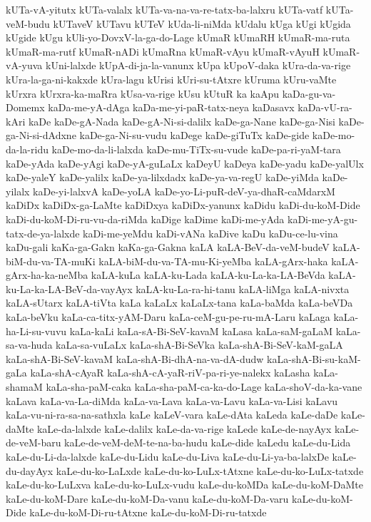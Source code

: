 {kUTa-vA-yitutx
kUTa-valalx
kUTa-va-na-va-re-tatx-ba-lalxru
kUTa-vatf
kUTa-veM-budu
kUTaveV
kUTavu
kUTeV
kUda-li-niMda
kUdalu
kUga
kUgi
kUgida
kUgide
kUgu
kUli-yo-DovxV-la-ga-do-Lage
kUmaR
kUmaRH
kUmaR-ma-ruta
kUmaR-ma-rutf
kUmaR-nADi
kUmaRna
kUmaR-vAyu
kUmaR-vAyuH
kUmaR-vA-yuva
kUni-lalxde
kUpA-di-ja-la-vanunx
kUpa
kUpoV-daka
kUra-da-va-rige
kUra-la-ga-ni-kakxde
kUra-lagu
kUrisi
kUri-su-tAtxre
kUruma
kUru-vaMte
kUrxra
kUrxra-ka-maRra
kUsa-va-rige
kUsu
kUtuR
ka
kaApu
kaDa-gu-va-Domemx
kaDa-me-yA-dAga
kaDa-me-yi-paR-tatx-neya
kaDasavx
kaDa-vU-ra-kAri
kaDe
kaDe-gA-Nada
kaDe-gA-Ni-si-dalilx
kaDe-ga-Nane
kaDe-ga-Nisi
kaDe-ga-Ni-si-dAdxne
kaDe-ga-Ni-su-vudu
kaDege
kaDe-giTuTx
kaDe-gide
kaDe-mo-da-la-ridu
kaDe-mo-da-li-lalxda
kaDe-mu-TiTx-su-vude
kaDe-pa-ri-yaM-tara
kaDe-yAda
kaDe-yAgi
kaDe-yA-guLaLx
kaDeyU
kaDeya
kaDe-yadu
kaDe-yalUlx
kaDe-yaleY
kaDe-yalilx
kaDe-ya-lilxdadx
kaDe-ya-va-regU
kaDe-yiMda
kaDe-yilalx
kaDe-yi-lalxvA
kaDe-yoLA
kaDe-yo-Li-puR-deV-ya-dhaR-caMdarxM
kaDiDx
kaDiDx-ga-LaMte
kaDiDxya
kaDiDx-yanunx
kaDidu
kaDi-du-koM-Dide
kaDi-du-koM-Di-ru-vu-da-riMda
kaDige
kaDime
kaDi-me-yAda
kaDi-me-yA-gu-tatx-de-ya-lalxde
kaDi-me-yeMdu
kaDi-vANa
kaDive
kaDu
kaDu-ce-lu-vina
kaDu-gali
kaKa-ga-Gakn
kaKa-ga-Gakna
kaLA
kaLA-BeV-da-veM-budeV
kaLA-biM-du-va-TA-muKi
kaLA-biM-du-va-TA-mu-Ki-yeMba
kaLA-gArx-haka
kaLA-gArx-ha-ka-neMba
kaLA-kuLa
kaLA-ku-Lada
kaLA-ku-La-ka-LA-BeVda
kaLA-ku-La-ka-LA-BeV-da-vayAyx
kaLA-ku-La-ra-hi-tanu
kaLA-liMga
kaLA-nivxta
kaLA-sUtarx
kaLA-tiVta
kaLa
kaLaLx
kaLaLx-tana
kaLa-baMda
kaLa-beVDa
kaLa-beVku
kaLa-ca-titx-yAM-Daru
kaLa-ceM-gu-pe-ru-mA-Laru
kaLaga
kaLa-ha-Li-su-vuvu
kaLa-kaLi
kaLa-sA-Bi-SeV-kavaM
kaLasa
kaLa-saM-gaLaM
kaLa-sa-va-huda
kaLa-sa-vuLaLx
kaLa-shA-Bi-SeVka
kaLa-shA-Bi-SeV-kaM-gaLA
kaLa-shA-Bi-SeV-kavaM
kaLa-shA-Bi-dhA-na-va-dA-dudw
kaLa-shA-Bi-su-kaM-gaLa
kaLa-shA-cAyaR
kaLa-shA-cA-yaR-riV-pa-ri-ye-nalekx
kaLasha
kaLa-shamaM
kaLa-sha-paM-caka
kaLa-sha-paM-ca-ka-do-Lage
kaLa-shoV-da-ka-vane
kaLava
kaLa-va-La-diMda
kaLa-va-Lava
kaLa-va-Lavu
kaLa-va-Lisi
kaLavu
kaLa-vu-ni-ra-sa-na-sathxla
kaLe
kaLeV-vara
kaLe-dAta
kaLeda
kaLe-daDe
kaLe-daMte
kaLe-da-lalxde
kaLe-dalilx
kaLe-da-va-rige
kaLede
kaLe-de-nayAyx
kaLe-de-veM-baru
kaLe-de-veM-deM-te-na-ba-hudu
kaLe-dide
kaLedu
kaLe-du-Lida
kaLe-du-Li-da-lalxde
kaLe-du-Lidu
kaLe-du-Liva
kaLe-du-Li-ya-ba-lalxDe
kaLe-du-dayAyx
kaLe-du-ko-LaLxde
kaLe-du-ko-LuLx-tAtxne
kaLe-du-ko-LuLx-tatxde
kaLe-du-ko-LuLxva
kaLe-du-ko-LuLx-vudu
kaLe-du-koMDa
kaLe-du-koM-DaMte
kaLe-du-koM-Dare
kaLe-du-koM-Da-vanu
kaLe-du-koM-Da-varu
kaLe-du-koM-Dide
kaLe-du-koM-Di-ru-tAtxne
kaLe-du-koM-Di-ru-tatxde
}
